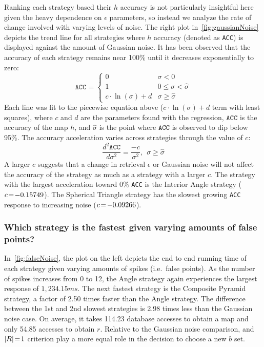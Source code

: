 Ranking each strategy based their $h$ accuracy is not particularly insightful here given the heavy dependence on $\epsilon$ parameters, so instead we analyze the rate of change involved with varying levels of noise.
The right plot in~\autoref{fig:gaussianNoise} depicts the trend line for all strategies where $h$ accuracy (denoted as \texttt{ACC}) is displayed against the amount of Gaussian noise.
It has been observed that the accuracy of each strategy remains near 100\% until it decreases exponentially to zero:
\begin{equation}
    \texttt{ACC} =
    \begin{cases}
        0 & \sigma < 0 \\
        1 & 0 \leq \sigma < \hat{\sigma} \\
        c \cdot \ln(\sigma) + d & \sigma \geq \hat{\sigma}
    \end{cases}
\end{equation}
Each line was fit to the piecewise equation above ($c\cdot \ln(\sigma) + d$ term with least squares), where $c$ and $d$ are the parameters found with the regression, $\texttt{ACC}$ is the accuracy of the map $h$, and $\hat{\sigma}$ is the point where $\texttt{ACC}$ is observed to dip below 95\%.
The accuracy acceleration varies across strategies through the value of $c$:
\begin{equation}
    \frac{d^{2}\texttt{ACC}}{d\sigma^2} = \frac{-c}{\sigma^2}, \ \ \sigma \geq \hat{\sigma}
\end{equation}
A larger $c$ suggests that a change in retrieval $\epsilon$ or Gaussian noise will not affect the accuracy of the strategy as much as a strategy with a larger $c$.
The strategy with the largest acceleration toward $0\%$ \texttt{ACC} is the Interior Angle strategy ($c \!=\! -0.15749$).
The Spherical Triangle strategy has the slowest growing \texttt{ACC} response to increasing noise ($c \!=\! -0.09266$).

\subsubsection{Which strategy is the fastest given varying amounts of false points?}
In~\autoref{fig:falseNoise}, the plot on the left depicts the end to end running time of each strategy given varying amounts of spikes (i.e.\ false points).
As the number of spikes increases from 0 to 12, the Angle strategy again experiences the largest response of $1{,}234.15\si{ms}$.
The next fastest strategy is the Composite Pyramid strategy, a factor of 2.50 times faster than the Angle strategy.
The difference between the 1st and 2nd slowest strategies is 2.98 times less than the Gaussian noise case.
On average, it takes 114.23 database accesses to obtain a map and only 54.85 accesses to obtain $r$.
Relative to the Gaussian noise comparison,  and $\left| R \right| \!=\! 1$ criterion play a more equal role in the decision to choose a new $b$ set.

